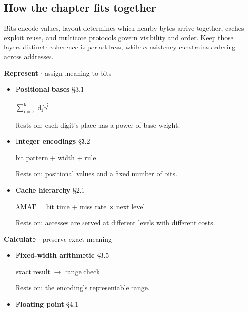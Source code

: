 \documentclass[11pt]{article}
\begin{document}
\begin{keepsection}
\section{How the chapter fits together}

Bits encode values, layout determines which nearby bytes arrive together, caches exploit reuse, and multicore protocols govern visibility and order. Keep those layers distinct: coherence is per address, while consistency constrains ordering across addresses.

\textbf{Represent} \ensuremath{\cdot} assign meaning to bits

\begin{itemize}
\item {}
\textbf{Positional bases} \hfill{\small\color{FAUblue}§3.1}

$\sum_{\mathrm{i}=0}^{\mathrm{k}} $ d\textsubscript{i}b\textsuperscript{i}

Rests on: each digit's place has a power-of-base weight.
\item {}
\textbf{Integer encodings} \hfill{\small\color{FAUblue}§3.2}

bit pattern + width + rule

Rests on: positional values and a fixed number of bits.
\item {}
\textbf{Cache hierarchy} \hfill{\small\color{FAUblue}§2.1}

AMAT = hit time + miss rate \ensuremath{\times} next level

Rests on: accesses are served at different levels with different costs.
\end{itemize}

\textbf{Calculate} \ensuremath{\cdot} preserve exact meaning

\begin{itemize}
\item {}
\textbf{Fixed-width arithmetic} \hfill{\small\color{FAUblue}§3.5}

exact result \ensuremath{\to} range check

Rests on: the encoding's representable range.
\item {}
\textbf{Floating point} \hfill{\small\color{FAUblue}§4.1}


\end{itemize}
\end{keepsection}
\end{document}
